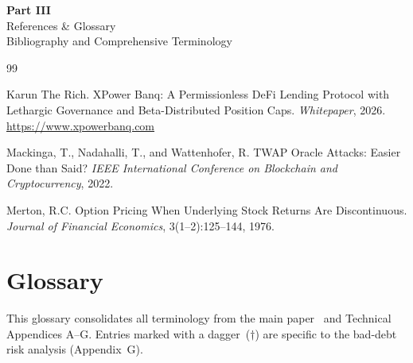 \documentclass[10pt,a4paper,twocolumn]{article}
\theoremstyle{definition}
\theoremstyle{plain}
\theoremstyle{remark}
\begin{document}
\clearpage
\onecolumn
\thispagestyle{empty}
\vspace*{\fill}
\begin{center}
  {\fontsize{36}{42}\selectfont\bfseries Part III}\\[1.5em]
  {\LARGE References \& Glossary}\\[1em]
  {\large\color{codegray} Bibliography and Comprehensive Terminology}
\end{center}
\vspace*{\fill}
\clearpage
\twocolumn

\begin{thebibliography}{99}


Karun The Rich.
\newblock XPower Banq: A Permissionless DeFi Lending Protocol with Lethargic Governance and Beta-Distributed Position Caps.
\newblock \emph{Whitepaper}, 2026.
\newblock \url{https://www.xpowerbanq.com}


Mackinga, T., Nadahalli, T., and Wattenhofer, R.
\newblock TWAP Oracle Attacks: Easier Done than Said?
\newblock \emph{IEEE International Conference on Blockchain and Cryptocurrency}, 2022.

Merton, R.C.
\newblock Option Pricing When Underlying Stock Returns Are Discontinuous.
\newblock \emph{Journal of Financial Economics}, 3(1--2):125--144, 1976.

\end{thebibliography}

\section*{Glossary}
\label{apx:glossary}

\noindent This glossary consolidates all terminology from the main paper~\cite{wp} and Technical Appendices A--G. Entries marked with a dagger~($\dagger$) are specific to the bad-debt risk analysis (Appendix~G).
\end{document}
